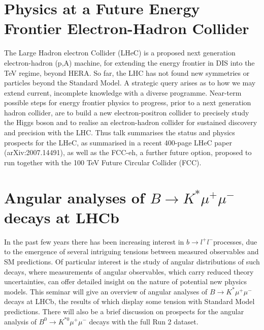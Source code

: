 \documentclass[12pt, a4paper, notitlepage, onecolumn]{article}
\begin{document}
\section{Physics at a Future Energy Frontier Electron-Hadron Collider}
\noindent The Large Hadron electron Collider (LHeC) is a proposed next generation electron-hadron (p,A) machine, for extending the energy frontier in DIS into the TeV regime, beyond HERA. So far, the LHC has not found new symmetries or particles beyond the Standard Model. A strategic query arises as to how we may extend current, incomplete knowledge with a diverse programme. Near-term possible steps for energy frontier physics to progress, prior to a next generation hadron collider, are to build a new electron-positron collider to precisely study the Higgs boson and to realise an electron-hadron collider for sustained discovery and precision with the LHC. Thus talk summarises the status and physics prospects for the LHeC, as summarised in a recent 400-page LHeC paper (arXiv:2007.14491), as well as the FCC-eh, a further future option, proposed to run together with the 100 TeV Future Circular Collider (FCC).

\section{Angular analyses of $B\to K^*\mu^+\mu^-$ decays at LHCb}
\noindent In the past few years there has been increasing interest in $b\to l^+l^-$processes, due to the emergence of several intriguing tensions between measured observables and SM predictions. Of particular interest is the study of angular distributions of such decays, where measurements of angular observables, which carry reduced theory uncertainties, can offer detailed insight on the nature of potential new physics models. This seminar will give an overview of angular analyses of $B\to K^*\mu^+\mu^-$ decays at LHCb, the results of which display some tension with Standard Model predictions. There will also be a brief discussion on prospects for the angular analysis of $B^0\to K^{*0}\mu^+\mu^-$ decays with the full Run 2 dataset.
\end{document}
